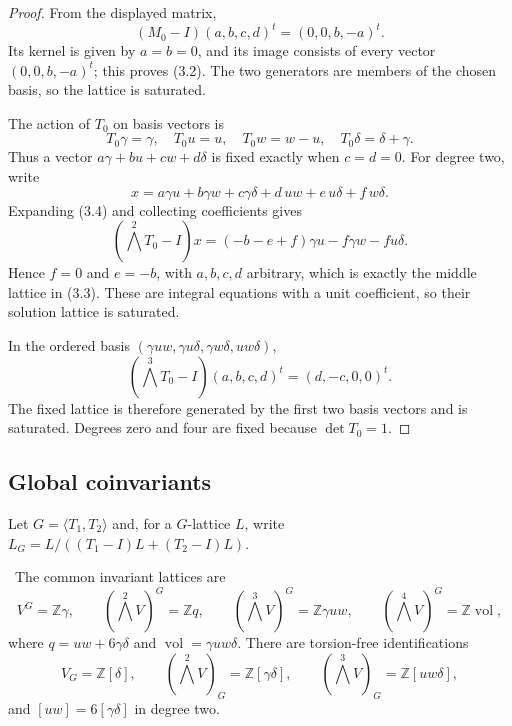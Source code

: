 \begin{proof}
From the displayed matrix,
\[
(M_0-I)(a,b,c,d)^t=(0,0,b,-a)^t.
\]
Its kernel is given by $a=b=0$, and its image consists of every vector
$(0,0,b,-a)^t$; this proves (3.2).  The two generators are members of the
chosen basis, so the lattice is saturated.

The action of $T_0$ on basis vectors is
\[
T_0\gamma=\gamma,\quad T_0u=u,\quad
T_0w=w-u,\quad T_0\delta=\delta+\gamma.
\tag{3.4}
\]
Thus a vector $a\gamma+bu+cw+d\delta$ is fixed exactly when $c=d=0$.
For degree two, write
\[
x=a\gamma u+b\gamma w+c\gamma\delta
  +d\,uw+e\,u\delta+f\,w\delta.
\]
Expanding (3.4) and collecting coefficients gives
\[
(\textstyle\bigwedge^2T_0-I)x
=(-b-e+f)\gamma u-f\gamma w-fu\delta .
\]
Hence $f=0$ and $e=-b$, with $a,b,c,d$ arbitrary, which is exactly the
middle lattice in (3.3).  These are integral equations with a unit
coefficient, so their solution lattice is saturated.

In the ordered basis
$(\gamma uw,\gamma u\delta,\gamma w\delta,uw\delta)$,
\[
(\textstyle\bigwedge^3T_0-I)(a,b,c,d)^t
=(d,-c,0,0)^t.
\]
The fixed lattice is therefore generated by the first two basis vectors and
is saturated.  Degrees zero and four are fixed because $\det T_0=1$.
\end{proof}

\subsection{Global coinvariants}

Let $G=\langle T_1,T_2\rangle$ and, for a $G$-lattice $L$, write
$L_G=L/((T_1-I)L+(T_2-I)L)$.

\begin{theorem}\label{wb:thm:coinvariants}
\ The common invariant lattices are
\[
 V^G=\mathbb Z\gamma,\qquad
 (\textstyle\bigwedge^2V)^G=\mathbb Zq,\qquad
 (\textstyle\bigwedge^3V)^G=\mathbb Z\gamma uw,\qquad
 (\textstyle\bigwedge^4V)^G=\mathbb Z\operatorname{vol},
\]
where $q=uw+6\gamma\delta$ and
$\operatorname{vol}=\gamma uw\delta$.  There are torsion-free
identifications
\[
V_G=\mathbb Z[\delta],\qquad
(\textstyle\bigwedge^2V)_G=\mathbb Z[\gamma\delta],
\qquad
(\textstyle\bigwedge^3V)_G=\mathbb Z[uw\delta],
\tag{3.5}
\]
and $[uw]=6[\gamma\delta]$ in degree two.
\end{theorem}

